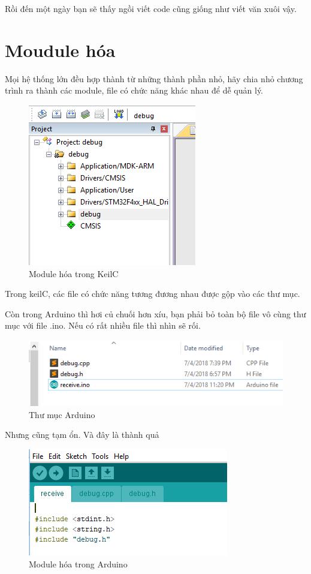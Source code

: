 Rồi đến một ngày bạn sẽ thấy ngồi viết code cũng giống như viết văn xuôi vậy.
\newpage
\section{Moudule hóa}

Mọi hệ thống lớn đều hợp thành từ những thành phần nhỏ, hãy chia nhỏ chương trình ra thành các module, file có chức năng khác nhau để dễ quản lý.
\begin{figure}[h!]
\centering
 \includegraphics[width=0.6\linewidth]{images/module.png}
 \caption{Module hóa trong KeilC}
\end{figure}

Trong keilC, các file có chức năng tương đương nhau được gộp vào các thư mục.

Còn trong Arduino thì hơi củ chuối hơn xíu, bạn phải bỏ toàn bộ file vô cùng thư mục với file .ino. Nếu có rất nhiều file thì nhìn sẽ rối.
\newpage 
\begin{figure}[h!]
\centering
 \includegraphics[width=1\linewidth]{images/arduino_folder.png}
 \caption{Thư mục Arduino}
\end{figure}

Nhưng cũng tạm ổn. Và đây là thành quả
\begin{figure}[h!]
\centering
 \includegraphics[width=0.8\linewidth]{images/arduino.png}
 \caption{Module hóa trong Arduino}
\end{figure}

